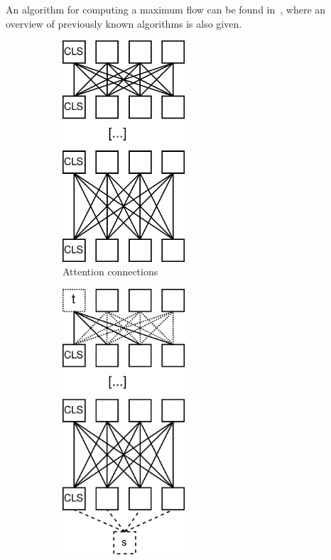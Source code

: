 \documentclass[a4paper]{scrartcl}
\begin{document}
    An algorithm for computing a maximum flow can be found in~\cite{goldberg1988anew}, where an overview of previously known algorithms is also given.

    \begin{figure}[btp]
        \centering
        \begin{subfigure}[t]{0.4\textwidth}
            \centering
            \includegraphics[width=0.5\textwidth]{img/AttentionGraph}
            \caption{Attention connections}
        \end{subfigure}
        \hfill
        \begin{subfigure}[t]{0.4\textwidth}
            \centering
            \includegraphics[width=0.5\textwidth]{img/AttentionFlowGraph}

\end{subfigure}
\end{figure}
\end{document}

